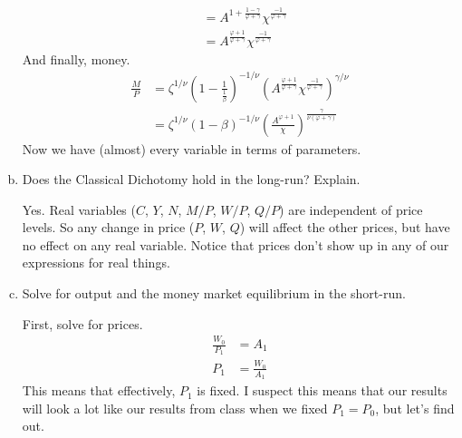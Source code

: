 \documentclass[answers]{exam}
\newcommand{\1}{\mathbf{1}}
\begin{document}
\begin{enumerate}[(a)]
\begin{solution}
\begin{align*}
            & = A^{1 + \frac{1 - \gamma}{\varphi + \gamma}}\chi^{\frac{-1}{\varphi + \gamma}} \\
            & = A^{\frac{\varphi + 1}{\varphi + \gamma}}\chi^{\frac{-1}{\varphi + \gamma}}
        \end{align*}
        And finally, money.
        \begin{align*}
            \frac{M}{P} & = \zeta^{1/\nu}\left(1-\frac{1}{\frac{1}{\beta}}\right)^{-1/\nu}\left(A^{\frac{\varphi + 1}{\varphi + \gamma}}\chi^{\frac{-1}{\varphi + \gamma}}\right)^{\gamma/\nu} \\
            & = \zeta^{1/\nu}\left(1-\beta\right)^{-1/\nu}\left(\frac{A^{\varphi + 1}}{\chi}\right)^{\frac{\gamma}{\nu(\varphi + \gamma)}}
        \end{align*}
        Now we have (almost) every variable in terms of parameters.
    \end{solution}
	\item Does the Classical Dichotomy hold in the long-run? Explain.
	\begin{solution}
        Yes. Real variables ($C$, $Y$, $N$, $M/P$, $W/P$, $Q/P$) are independent of price levels. So any change in price ($P$, $W$, $Q$) will affect the other prices, but have no effect on any real variable. Notice that prices don't show up in any of our expressions for real things. 
    \end{solution}
	\item Solve for output and the money market equilibrium in the short-run.
	\begin{solution}
        First, solve for prices.
        \begin{align*}
            \frac{W_0}{P_1} & = A_1 \\
            P_1 & = \frac{W_0}{A_1}
        \end{align*}
        This means that effectively, $P_1$ is fixed. I suspect this means that our results will look a lot like our results from class when we fixed $P_1 = P_0$, but let's find out.
        

\end{solution}
\end{enumerate}
\end{document}
